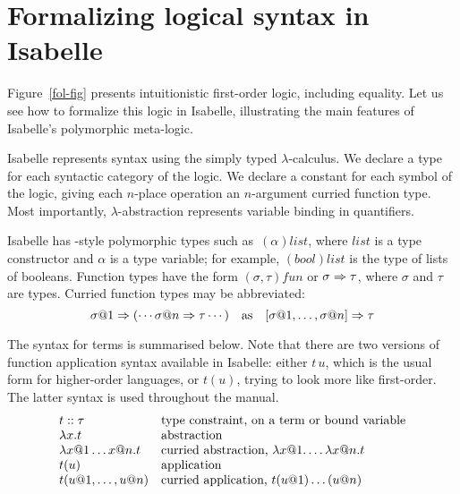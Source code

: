 \section{Formalizing logical syntax in Isabelle}\label{sec:logical-syntax}

Figure~\ref{fol-fig} presents intuitionistic first-order logic,
including equality. Let us see how to formalize
this logic in Isabelle, illustrating the main features of Isabelle's
polymorphic meta-logic.

Isabelle represents syntax using the simply typed $\lambda$-calculus. We
declare a type for each syntactic category of the logic. We declare a
constant for each symbol of the logic, giving each $n$-place operation an
$n$-argument curried function type. Most importantly,
$\lambda$-abstraction represents variable binding in quantifiers.

Isabelle has \ML-style polymorphic types such as~$(\alpha)list$, where
$list$ is a type constructor and $\alpha$ is a type variable; for example,
$(bool)list$ is the type of lists of booleans. Function types have the
form $(\sigma,\tau)fun$ or $\sigma\Rightarrow\tau$, where $\sigma$ and $\tau$ are
types. Curried function types may be abbreviated:
\[  \sigma@1\To (\cdots \sigma@n\To \tau\cdots)  \quad \hbox{as} \quad
[\sigma@1, \ldots, \sigma@n] \To \tau \]

 The syntax for terms is summarised below.
Note that there are two versions of function application syntax
available in Isabelle: either $t\,u$, which is the usual form for
higher-order languages, or $t(u)$, trying to look more like
first-order. The latter syntax is used throughout the manual.
\[
    \index{lambda abs@$\lambda$-abstractions}\index{function applications}
    \begin{array}{ll}
        t :: \tau   & \hbox{type constraint, on a term or bound variable} \\
        \lambda x.t   & \hbox{abstraction} \\
        \lambda x@1\ldots x@n.t
        & \hbox{curried abstraction, $\lambda x@1. \ldots \lambda x@n.t$} \\
        t(u)          & \hbox{application} \\
        t (u@1, \ldots, u@n) & \hbox{curried application, $t(u@1)\ldots(u@n)$}
    \end{array}
\]

